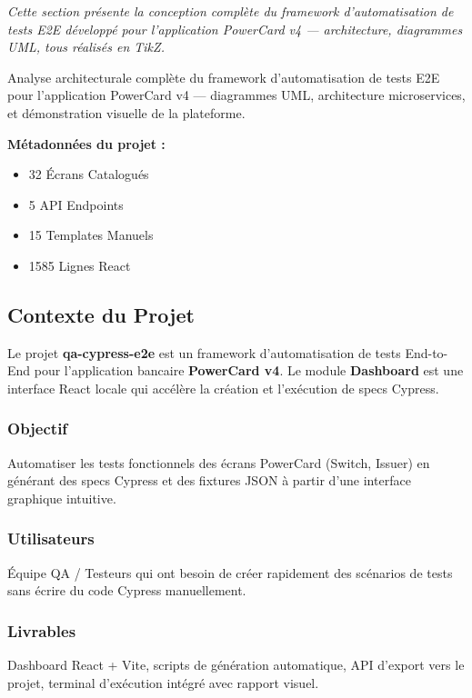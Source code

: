 \textit{Cette section présente la conception complète du framework d'automatisation de tests E2E développé pour l'application PowerCard v4 --- architecture, diagrammes UML, tous réalisés en TikZ.}

\vspace{10pt}

\begin{tcolorbox}[colback=primary!5, colframe=primary, title=Résumé du Projet Dashboard, arc=5pt]
Analyse architecturale complète du framework d'automatisation de tests E2E pour l'application PowerCard v4 --- diagrammes UML, architecture microservices, et démonstration visuelle de la plateforme.

\vspace{5pt}
\textbf{Métadonnées du projet :}
\begin{itemize}[leftmargin=1.5em]
    \item 32 Écrans Catalogués
    \item 5 API Endpoints
    \item 15 Templates Manuels
    \item 1585 Lignes React
\end{itemize}
\end{tcolorbox}

\subsection{Contexte du Projet}
Le projet \textbf{qa-cypress-e2e} est un framework d'automatisation de tests End-to-End pour l'application bancaire \textbf{PowerCard v4}. Le module \textbf{Dashboard} est une interface React locale qui accélère la création et l'exécution de specs Cypress.

\subsubsection*{Objectif}
Automatiser les tests fonctionnels des écrans PowerCard (Switch, Issuer) en générant des specs Cypress et des fixtures JSON à partir d'une interface graphique intuitive.

\subsubsection*{Utilisateurs}
Équipe QA / Testeurs qui ont besoin de créer rapidement des scénarios de tests sans écrire du code Cypress manuellement.

\subsubsection*{Livrables}
Dashboard React + Vite, scripts de génération automatique, API d'export vers le projet, terminal d'exécution intégré avec rapport visuel.

